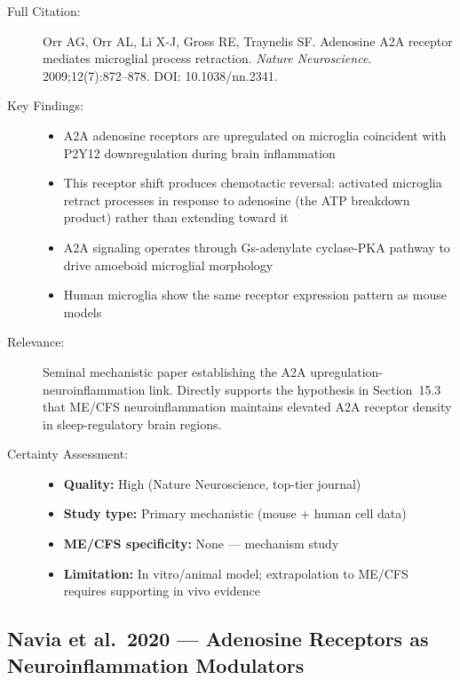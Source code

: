 \begin{description}
    \item[Full Citation:] Orr AG, Orr AL, Li X-J, Gross RE, Traynelis SF\@. Adenosine A2A receptor mediates microglial process retraction. \textit{Nature Neuroscience}. 2009;12(7):872--878. DOI: 10.1038/nn.2341.
    \item[Key Findings:]
    \begin{itemize}
        \item A2A adenosine receptors are upregulated on microglia coincident with P2Y12 downregulation during brain inflammation
        \item This receptor shift produces chemotactic reversal: activated microglia retract processes in response to adenosine (the ATP breakdown product) rather than extending toward it
        \item A2A signaling operates through Gs-adenylate cyclase-PKA pathway to drive amoeboid microglial morphology
        \item Human microglia show the same receptor expression pattern as mouse models
    \end{itemize}
    \item[Relevance:] Seminal mechanistic paper establishing the A2A upregulation-neuroinflammation link. Directly supports the hypothesis in Section~15.3 that ME/CFS neuroinflammation maintains elevated A2A receptor density in sleep-regulatory brain regions.
    \item[Certainty Assessment:]
    \begin{itemize}
        \item \textbf{Quality:} High (Nature Neuroscience, top-tier journal)
        \item \textbf{Study type:} Primary mechanistic (mouse + human cell data)
        \item \textbf{ME/CFS specificity:} None --- mechanism study
        \item \textbf{Limitation:} In vitro/animal model; extrapolation to ME/CFS requires supporting in vivo evidence
    \end{itemize}
\end{description}

\subsection{Navia et al.\ 2020 --- Adenosine Receptors as Neuroinflammation Modulators}

